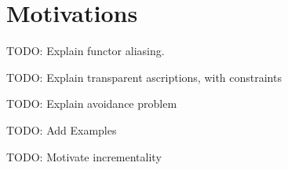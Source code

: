 \section{Motivations}
\label{motivations}

TODO: Explain functor aliasing.

TODO: Explain transparent ascriptions, with constraints

TODO: Explain avoidance problem

TODO: Add Examples

TODO: Motivate incrementality

